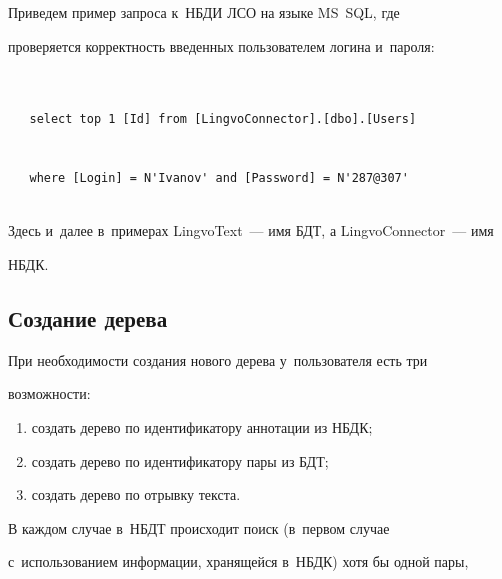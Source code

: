   


  Приведем пример запроса к~НБДИ ЛСО на языке MS~SQL, где 


проверяется корректность введенных пользователем логина и~пароля:





\noindent


{\small  \begin{verbatim}


   select top 1 [Id] from [LingvoConnector].[dbo].[Users] 


   where [Login] = N'Ivanov' and [Password] = N'287@307'


   \end{verbatim}


   }


   


   \noindent


Здесь и~далее в~примерах LingvoText~--- имя БДТ, а LingvoConnector~--- имя 


НБДК.


  


  \subsection{Создание дерева}


  


  При необходимости создания нового дерева у~пользователя есть три 


возможности:


  \begin{enumerate}[(1)]


\item создать дерево по идентификатору аннотации из НБДК;


\item создать дерево по идентификатору пары из БДТ;


\item создать дерево по отрывку текста.


\end{enumerate}





  В каж\-дом случае в~НБДТ происходит поиск (в~первом случае 


с~использованием информации, хранящейся в~НБДК) хотя бы одной пары, 


